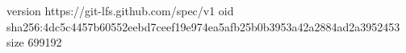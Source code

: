 version https://git-lfs.github.com/spec/v1
oid sha256:4dc5c4457b60552eebd7ceef19e974ea5afb25b0b3953a42a2884ad2a3952453
size 699192
